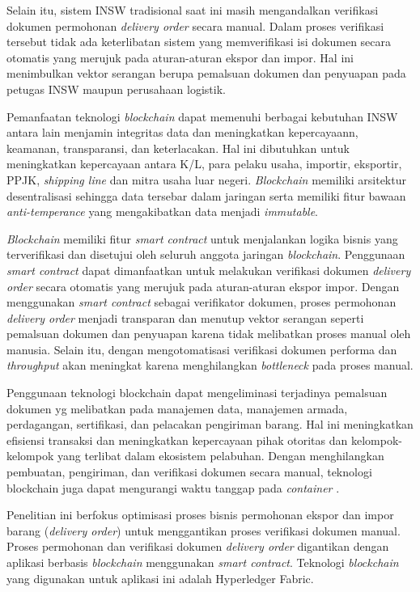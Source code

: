 Selain itu, sistem INSW tradisional saat ini masih mengandalkan verifikasi dokumen permohonan \textit{delivery order} secara manual. Dalam proses verifikasi tersebut tidak ada keterlibatan sistem yang memverifikasi isi dokumen secara otomatis yang merujuk pada aturan-aturan ekspor dan impor. Hal ini menimbulkan vektor serangan berupa pemalsuan dokumen dan penyuapan pada petugas INSW maupun perusahaan logistik. 

Pemanfaatan teknologi \textit{blockchain} dapat memenuhi berbagai kebutuhan INSW antara lain menjamin integritas data dan meningkatkan kepercayaann, keamanan, transparansi, dan keterlacakan. Hal ini dibutuhkan untuk meningkatkan kepercayaan antara K/L, para pelaku usaha, importir, eksportir, PPJK, \textit{shipping line} dan mitra usaha luar negeri. \textit{Blockchain} memiliki arsitektur desentralisasi sehingga data tersebar dalam jaringan serta memiliki fitur bawaan \textit{anti-temperance} yang mengakibatkan data menjadi \textit{immutable}. 

\textit{Blockchain} memiliki fitur \textit{smart contract} untuk menjalankan logika bisnis yang terverifikasi dan disetujui oleh seluruh anggota jaringan \textit{blockchain}. Penggunaan \textit{smart contract} dapat dimanfaatkan untuk melakukan verifikasi dokumen \textit{delivery order} secara otomatis yang merujuk pada aturan-aturan ekspor impor. Dengan menggunakan \textit{smart contract} sebagai verifikator dokumen, proses permohonan \textit{delivery order} menjadi transparan dan menutup vektor serangan seperti pemalsuan dokumen dan penyuapan karena tidak melibatkan proses manual oleh manusia. Selain itu, dengan mengotomatisasi verifikasi dokumen performa dan \textit{throughput} akan meningkat karena menghilangkan \textit{bottleneck} pada proses manual.

Penggunaan teknologi blockchain dapat mengeliminasi terjadinya pemalsuan dokumen yg melibatkan pada manajemen data, manajemen armada, perdagangan, sertifikasi, dan pelacakan pengiriman barang. Hal ini meningkatkan efisiensi transaksi dan meningkatkan kepercayaan pihak otoritas dan kelompok-kelompok yang terlibat dalam ekosistem pelabuhan. Dengan menghilangkan pembuatan, pengiriman, dan verifikasi dokumen secara manual, teknologi blockchain juga dapat mengurangi waktu tanggap pada \textit{container} \citep{Ahmad2021}.

Penelitian ini berfokus optimisasi proses bisnis permohonan ekspor dan impor barang (\textit{delivery order}) untuk menggantikan proses verifikasi dokumen manual. Proses permohonan dan verifikasi dokumen \textit{delivery order} digantikan dengan aplikasi berbasis \textit{blockchain} menggunakan \textit{smart contract}. Teknologi \textit{blockchain} yang digunakan untuk aplikasi ini adalah Hyperledger Fabric. 

